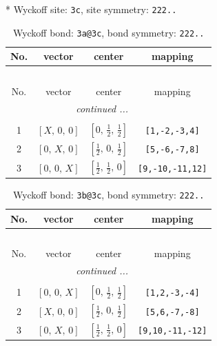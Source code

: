 \documentclass[fleqn,8pt]{jsarticle}
\begin{document}
* Wyckoff site: {\tt 3c}, site symmetry: {\tt 222..}
\renewcommand{\arraystretch}{1.2}
\begin{longtable}{cccc}
\caption{Wyckoff bond: {\tt 3a@3c}, bond symmetry: {\tt 222..}}
 \\
 \hline \hline
No. & vector & center & mapping \\ \hline \endfirsthead

\multicolumn{3}{l}{\tablename\ \thetable{}} \\
 \hline \hline
No. & vector & center & mapping \\ \hline \endhead

 \hline \hline
\multicolumn{3}{r}{\footnotesize\it continued ...} \\ \endfoot

 \hline \hline
\multicolumn{3}{r}{} \\ \endlastfoot

1 & $\left[ X,\, 0,\, 0 \right]$ & $\left[ 0,\, \frac{1}{2},\, \frac{1}{2} \right]$ & {\tt [1,-2,-3,4]} \\ \hline
2 & $\left[ 0,\, X,\, 0 \right]$ & $\left[ \frac{1}{2},\, 0,\, \frac{1}{2} \right]$ & {\tt [5,-6,-7,8]} \\ \hline
3 & $\left[ 0,\, 0,\, X \right]$ & $\left[ \frac{1}{2},\, \frac{1}{2},\, 0 \right]$ & {\tt [9,-10,-11,12]} \\
\end{longtable}
\renewcommand{\arraystretch}{1.2}
\begin{longtable}{cccc}
\caption{Wyckoff bond: {\tt 3b@3c}, bond symmetry: {\tt 222..}}
 \\
 \hline \hline
No. & vector & center & mapping \\ \hline \endfirsthead

\multicolumn{3}{l}{\tablename\ \thetable{}} \\
 \hline \hline
No. & vector & center & mapping \\ \hline \endhead

 \hline \hline
\multicolumn{3}{r}{\footnotesize\it continued ...} \\ \endfoot

 \hline \hline
\multicolumn{3}{r}{} \\ \endlastfoot

1 & $\left[ 0,\, 0,\, X \right]$ & $\left[ 0,\, \frac{1}{2},\, \frac{1}{2} \right]$ & {\tt [1,2,-3,-4]} \\ \hline
2 & $\left[ X,\, 0,\, 0 \right]$ & $\left[ \frac{1}{2},\, 0,\, \frac{1}{2} \right]$ & {\tt [5,6,-7,-8]} \\ \hline
3 & $\left[ 0,\, X,\, 0 \right]$ & $\left[ \frac{1}{2},\, \frac{1}{2},\, 0 \right]$ & {\tt [9,10,-11,-12]} \\
\end{longtable}
\end{document}
